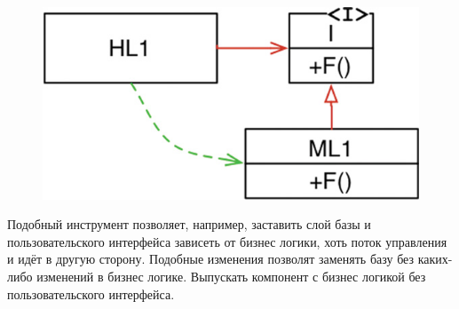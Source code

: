 \begin{figure}[h]
  \centering
    \includegraphics{inc/img/inverted.jpeg}
  \label{img:direct:dep}
\end{figure}

Подобный инструмент позволяет, например, заставить слой базы и пользовательского интерфейса зависеть от бизнес логики, хоть поток управления и идёт в другую сторону. Подобные изменения позволят заменять базу без каких-либо изменений в бизнес логике. Выпускать компонент с бизнес логикой без пользовательского интерфейса.
